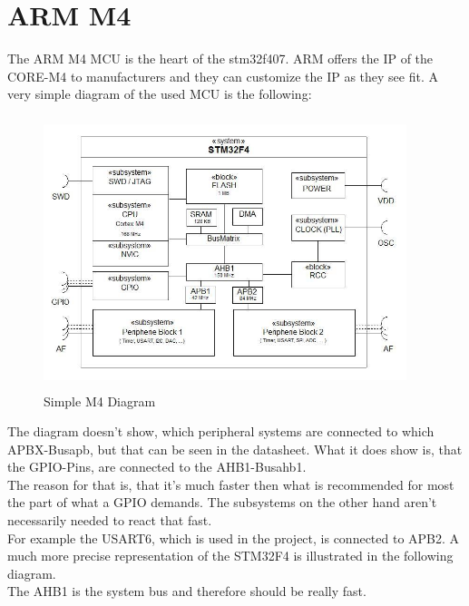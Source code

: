 \chapter{ARM M4}
The ARM M4 MCU is the heart of the stm32f407. ARM offers the IP of the
CORE-M4 to manufacturers and they can customize the IP as they see fit.
A very simple diagram of the used MCU is the following:\\

\begin{figure}[ht]
	\centering
	\includegraphics[width=400px,height=300px]{../img/stm32f4_prinzip.jpeg}
	\caption{Simple M4 Diagram}
	\label{m4_simple}
\end{figure}

The diagram doesn't show, which peripheral systems are connected to which
APBX-Bus\gls{apb}, but that can be seen in the datasheet. What it does show is, that
the GPIO-Pins, are connected to the AHB1-Bus\gls{ahb1}.\\
The reason for that is, that it's much faster then what is recommended
 for most the part of what a GPIO demands. The subsystems on the other hand aren't
 necessarily needed to react that fast.\\

For example the USART6, which is used in the project, is connected to APB2.
A much more precise representation of the STM32F4 is illustrated in the following diagram.\\

The AHB1 is the system bus and therefore should be really fast.

